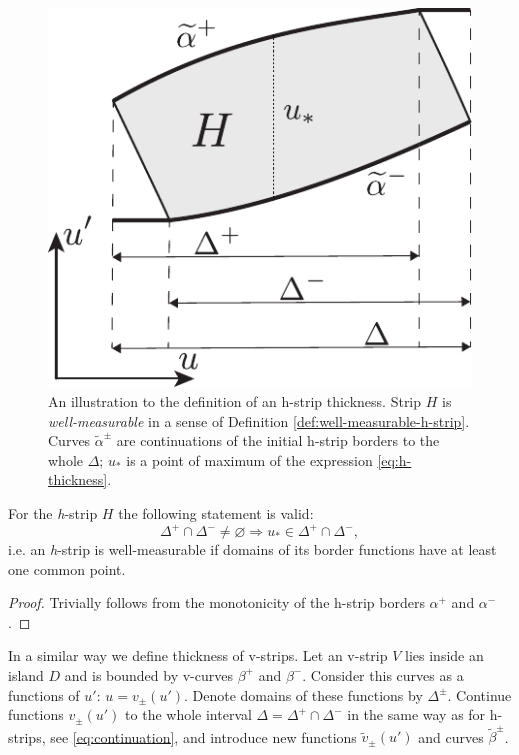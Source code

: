 \begin{figure}[h]
\centering
	\includegraphics[scale = 1]{pic/thickness definition}
	\caption{An illustration to the definition of an h-strip thickness. Strip $H$ is {\it well-measurable} in a sense of Definition \ref{def:well-measurable-h-strip}. Curves $\widetilde{\alpha}^{\pm}$ are continuations of the initial h-strip borders to the whole $\Delta$; $u_*$ is a point of maximum of the expression \eqref{eq:h-thickness}.}
\label{fig:thickness-definition}
\end{figure}

\begin{proposition}
	For the \emph{h}-strip $H$ the following statement is valid:
	\begin{equation}
		\Delta^+ \cap \Delta^- \neq \varnothing \Rightarrow u_* \in \Delta^+ \cap \Delta^-,
	\end{equation}
	i.e. an \emph{h}-strip is well-measurable if domains of its border functions have at least one common point.
\end{proposition}
\begin{proof}
	Trivially follows from the monotonicity of the h-strip borders $\alpha^+$ and $\alpha^-$.
\end{proof}

In a similar way we define thickness of v-strips.
Let an v-strip $V$ lies inside an island $D$ and is bounded by v-curves $\beta^+$ and $\beta^-$.
Consider this curves as a functions of $u'$: $u = v_{\pm}(u')$.
Denote domains of these functions by $\Delta^{\pm}$.
Continue functions $v_{\pm}(u')$ to the whole interval $\Delta = \Delta^+ \cap \Delta^-$ in the same way as for h-strips, see \eqref{eq:continuation}, and introduce new functions $\widetilde{v}_{\pm}(u')$ and curves $\widetilde{\beta}^{\pm}$.

